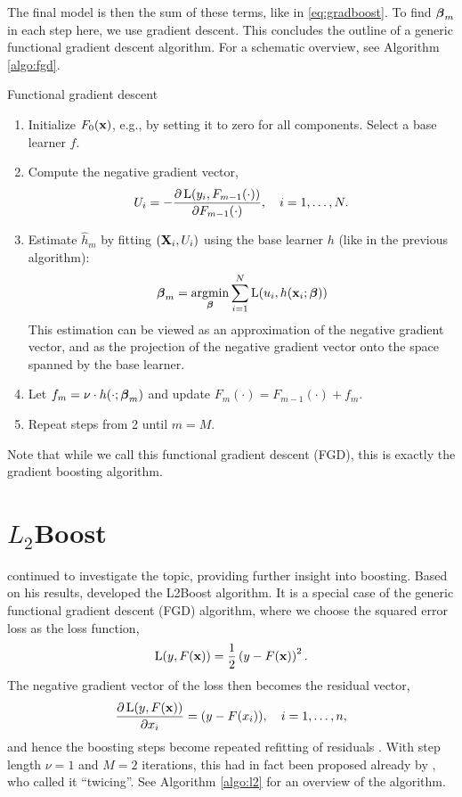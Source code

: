 The final model is then the sum of these terms, like in \eqref{eq:gradboost}. To find $\boldsymbol{\beta}_m$ in each step here, we use gradient descent. This concludes the outline of a generic functional gradient descent algorithm. For a schematic overview, see Algorithm \ref{algo:fgd}.
\begin{algorithm}
\caption{Functional gradient descent}
\label{algo:fgd}
\begin{enumerate}
    \item Initialize $F_0(\mathbf{x})$, e.g., by setting it to zero for all components. Select a base learner $f$.
    \item Compute the negative gradient vector,
        \begin{equation*}
            U_i=-\frac{\partial \operatorname{L}(y_i,F_{m-1}(\cdot))}{\partial F_{m-1}(\cdot)},\quad i=1,\dotsc,N.
        \end{equation*}
    \item Estimate $\hat{h}_m$ by fitting $(\mathbf{X}_i,U_i)$ using the base learner $h$ (like in the previous algorithm):
        \begin{equation*}
            \boldsymbol{\beta}_m=\operatorname*{argmin}_{\boldsymbol{\beta}}\sum_{i=1}^N\operatorname{L}(u_i,h(\mathbf{x}_i;\boldsymbol{\beta}))
        \end{equation*}
        This estimation can be viewed as an approximation of the negative gradient vector, and as the projection of the negative gradient vector onto the space spanned by the base learner.
    \item Let $f_m=\nu\cdot h(\cdot;\boldsymbol{\beta}_m)$ and update $F_m(\cdot)=F_{m-1}(\cdot)+f_m$.
    \item Repeat steps from 2 until $m=M$.
\end{enumerate}
\end{algorithm}
Note that while we call this functional gradient descent (FGD), this is exactly the gradient boosting algorithm.




\section{$L_2$Boost}
\citet{friedman2001} continued to investigate the topic, providing further insight into boosting. Based on his results, \citet{buhlmann-yu} developed the L2Boost algorithm. It is a special case of the generic functional gradient descent (FGD) algorithm, where we choose the squared error loss as the loss function,
\begin{equation*}
    \operatorname{L}(y,F(\mathbf{x}))=\frac{1}{2}\left(y-F(\mathbf{x})\right)^2.
\end{equation*}
The negative gradient vector of the loss then becomes the residual vector,
\begin{equation*}
    \frac{\partial\operatorname{L}(y,F(\mathbf{x}))}{\partial x_i}=(y-F(x_i)),\quad i=1,\dotsc,n,
\end{equation*}
and hence the boosting steps become repeated refitting of residuals \citep{friedman2001,buhlmann-yu}. With step length $\nu=1$ and $M=2$ iterations, this had in fact been proposed already by \citep{tukey}, who called it ``twicing''. See Algorithm \ref{algo:l2} for an overview of the algorithm.

